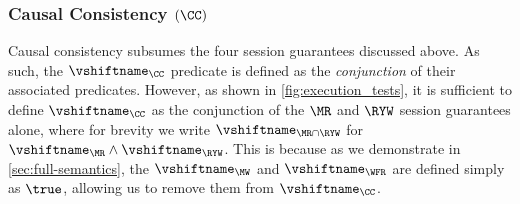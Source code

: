 %



\subsubsection{Causal Consistency $(\CC)$}
Causal consistency subsumes the  four session guarantees discussed above. 
As such, the $\vshiftname_\CC$ predicate is defined as the \emph{conjunction} of their associated \vshiftname predicates.
However, as shown in  \cref{fig:execution_tests}, it is sufficient to define $\vshiftname_\CC$
as the conjunction of the $\MR$ and $\RYW$ session guarantees alone, where for brevity we 
write $\vshiftname_{\MR \cap \RYW}$ for  $\vshiftname_{\MR} \land \vshiftname_{\RYW}$.
This is because 
as we demonstrate in \cref{sec:full-semantics},
the $\vshiftname_{\MW}$ and $\vshiftname_{\WFR}$ are defined simply as \( \true \), allowing us to remove them from $\vshiftname_{\CC}$.

